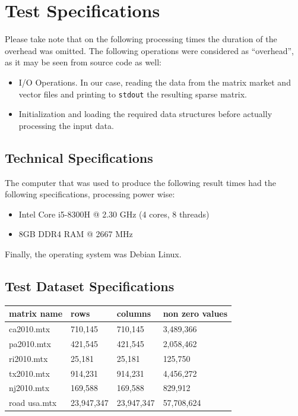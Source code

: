 \documentclass[11pt]{article}
\begin{document}
\section{Test Specifications}
\label{sec:org745ad35}
Please take note that on the following processing times the duration of the overhead was omitted. The following operations were considered as ``overhead'', as it may be seen from source code as well:
\begin{itemize}
\item I/O Operations. In our case, reading the data from the matrix market and vector files and printing to \texttt{stdout} the resulting sparse matrix.
\item Initialization and loading the required data structures before actually processing the input data.
\end{itemize}
\subsection{Technical Specifications}
\label{sec:orga708cec}
The computer that was used to produce the following result times had the following specifications, processing power wise:
\begin{itemize}
\item Intel Core i5-8300H @ 2.30 GHz (4 cores, 8 threads)
\item 8GB DDR4 RAM @ 2667 MHz
\end{itemize}
Finally, the operating system was Debian Linux.
\subsection{Test Dataset Specifications}
\label{sec:orgf2274de}
\begin{center}
\begin{tabular}{llll}
\hline
matrix name & rows & columns & non zero values\\[0pt]
\hline
ca2010.mtx & 710,145 & 710,145 & 3,489,366\\[0pt]
pa2010.mtx & 421,545 & 421,545 & 2,058,462\\[0pt]
ri2010.mtx & 25,181 & 25,181 & 125,750\\[0pt]
tx2010.mtx & 914,231 & 914,231 & 4,456,272\\[0pt]
nj2010.mtx & 169,588 & 169,588 & 829,912\\[0pt]
road usa.mtx & 23,947,347 & 23,947,347 & 57,708,624\\[0pt]
\hline
\end{tabular}
\end{center}
\end{document}
